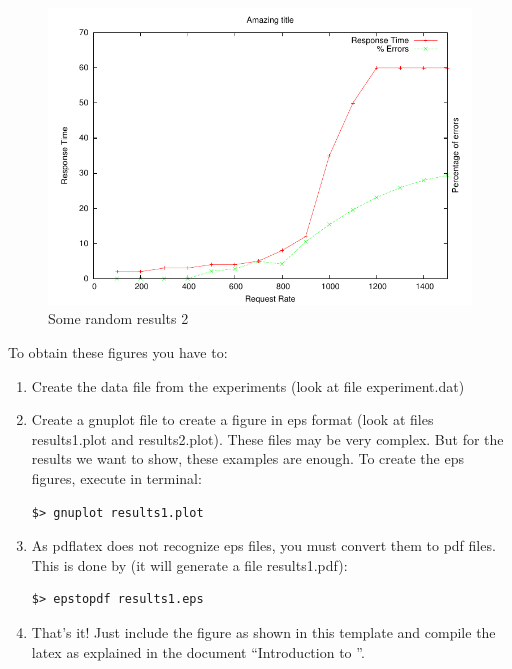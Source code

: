 \documentclass[a4paper, 11pt]{article}
\begin{document}
\begin{figure}
  \begin{center}
    \includegraphics{results2.pdf}
    \caption{Some random results 2}
    \label{fig:results2}
  \end{center}
\end{figure}

To obtain these figures you have to:
\begin{enumerate}

\item Create the data file from the experiments (look at file
  experiment.dat)

\item Create a gnuplot file to create a figure in eps format (look at
  files results1.plot and results2.plot). These files may be very
  complex. But for the results we want to show, these examples are
  enough. To create the eps figures, execute in terminal:

\begin{verbatim}
$> gnuplot results1.plot 
\end{verbatim}

\item As pdflatex does not recognize eps files, you must convert them
  to pdf files. This is done by (it will generate a file
  results1.pdf):

\begin{verbatim}
$> epstopdf results1.eps
\end{verbatim}

\item That's it! Just include the figure as shown in this template and
  compile the latex as explained in the document ``Introduction to
  \LaTeXe''.

\end{enumerate}
\end{document}
